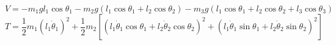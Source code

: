
\begin{equation}
V = -m_1 g l_1 \cos \theta_1 - m_2 g (l_1\cos \theta_1 + l_2 \cos \theta_2) - m_3 g (l_1 \cos\theta_1 + l_2 \cos \theta_2 + l_3 \cos \theta_3)
\end{equation}
\begin{equation}
T = \frac{1}{2} m_1 (l_1 \dot \theta_1)^2 + \frac{1}{2} m_2 [(l_1 \dot \theta_1 \cos\theta_1 + l_2 \dot \theta_2 \cos\theta_2)^2 + (l_1 \dot \theta_1 \sin\theta_1 + l_2 \dot \theta_2 \sin\theta_2)^2]
\end{equation}

